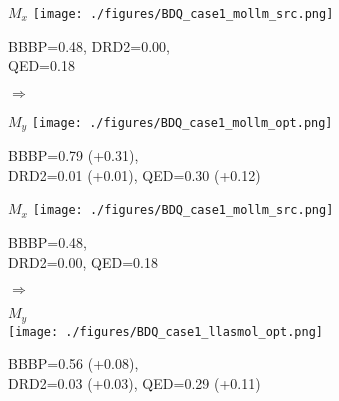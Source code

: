 \begin{figure}[htbp]
    \centering
    \begin{minipage}{0.43\linewidth}
        \centering
        \tiny $M_x$
        \texttt{[image: ./figures/BDQ\_case1\_mollm\_src.png]}
        \par\vspace{2pt}
        \tiny BBBP=0.48, DRD2=0.00, \\
        \tiny QED=0.18
    \end{minipage}
    \hfill
    \begin{minipage}{0.1\linewidth}
        \centering \Large$\Rightarrow$\\
        \raggedright \tiny \mollm
        \raggedright \tiny {}
    \end{minipage}
    \hfill
    \begin{minipage}{0.44\linewidth}
        \centering
        \tiny $M_y$
        \texttt{[image: ./figures/BDQ\_case1\_mollm\_opt.png]}
        \par\vspace{2pt}
        \tiny BBBP=0.79 (+0.31),\\ 
        \tiny DRD2=0.01 (+0.01), QED=0.30 (+0.12)
    \end{minipage}

    \vspace{1em}

    \begin{minipage}{0.43\linewidth}
        \centering
        \tiny $M_x$
        \texttt{[image: ./figures/BDQ\_case1\_mollm\_src.png]}
        \par\vspace{2pt}
        \tiny BBBP=0.48, \\
        \tiny DRD2=0.00, QED=0.18
    \end{minipage}
    \hfill
    \begin{minipage}{0.1\linewidth}
        \centering \Large$\Rightarrow$\\
        \raggedright \tiny \LlaSMol
        \raggedright \tiny {}
    \end{minipage}
    \hfill
    \begin{minipage}{0.44\linewidth}
        \centering
        \tiny $M_y$\\
        \texttt{[image: ./figures/BDQ\_case1\_llasmol\_opt.png]}
        \par\vspace{1pt}
        \tiny BBBP=0.56 (+0.08), \\ 
        \tiny DRD2=0.03 (+0.03), QED=0.29 (+0.11)
    \end{minipage}
\end{figure}
